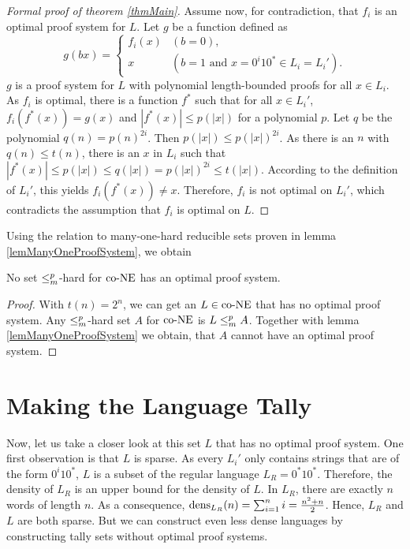 \begin{proof}[Formal proof of theorem \ref{thmMain}]
    Assume now, for contradiction, that \(f_i\) is an optimal proof system for \(L\). Let \(g\) be a function defined as
      \[ g(bx) = \begin{cases}
                  f_i(x) & (b = 0), \\
                  x & (b = 1 \text{ and } x = 0^i10^* \in L_i = L_i').
                 \end{cases} \]
    \(g\) is a proof system for \(L\) with polynomial length-bounded proofs for all \(x \in L_i\). As \(f_i\) is optimal, there is a function \(f^*\) such that for all \(x \in L_i'\), \(f_i(f^*(x)) = g(x)\) and \(|f^*(x)| \leq p(|x|)\) for a polynomial \(p\). Let \(q\) be the polynomial \(q(n) = p(n)^{2i}\). Then \(p(|x|) \leq p(|x|)^{2i}\). As there is an \(n\) with \(q(n) \leq t(n)\), there is an \(x\) in \(L_i\) such that \(|f^*(x)| \leq p(|x|) \leq q(|x|) = p(|x|)^{2i} \leq t(|x|)\). According to the definition of \(L_i'\), this yields \(f_i(f^*(x)) \neq x\). Therefore, \(f_i\) is not optimal on \(L_i'\), which contradicts the assumption that \(f_i\) is optimal on \(L\).
  \end{proof}

  Using the relation to many-one-hard reducible sets proven in lemma \ref{lemManyOneProofSystem}, we obtain

  \begin{corollary} \label{corHardSets}
    No set \(\leq_{m}^{p}\)-hard for \(\text{co-NE}\) has an optimal proof system.
  \end{corollary}

  \begin{proof}
    With \(t(n) = 2^n\), we can get an \(L \in \text{co-NE}\) that has no optimal proof system. Any \(\leq_{m}^{p}\)-hard set \(A\) for \(\text{co-NE}\) is \(L \leq_{m}^{p} A\). Together with lemma \ref{lemManyOneProofSystem} we obtain, that \(A\) cannot have an optimal proof system.
  \end{proof}

  \section{Making the Language Tally}

  Now, let us take a closer look at this set \(L\) that has no optimal proof system. One first observation is that \(L\) is sparse. As every \(L_i'\) only contains strings that are of the form \(0^i10^*\), \(L\) is a subset of the regular language \(L_R = 0^*10^*\). Therefore, the density of \(L_R\) is an upper bound for the density of \(L\). In \(L_R\), there are exactly \(n\) words of length \(n\). As a consequence, \(\operatorname{dens}_{L_R}(n) = \sum_{i=1}^n i = \frac{n^2 + n}{2}\). Hence, \(L_R\) and \(L\) are both sparse. But we can construct even less dense languages by constructing tally sets without optimal proof systems.

